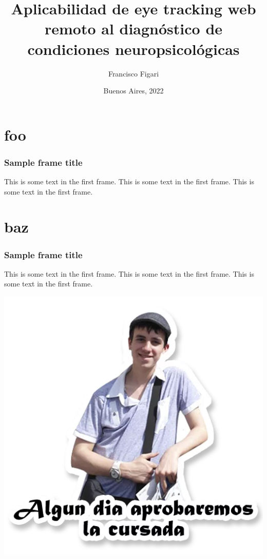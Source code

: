 \documentclass{beamer}
\title{Aplicabilidad de eye tracking web remoto al diagnóstico de
condiciones neuropsicológicas}
\author{Francisco Figari}
\date{Buenos Aires, 2022}
\begin{document}
\frame{\titlepage}

\section{foo}

\begin{frame}

\frametitle{Sample frame title}

This is some text in the first frame.
This is some text in the first frame.
This is some text in the first frame.

\end{frame}

\section{baz}

\begin{frame}

\frametitle{Sample frame title}

This is some text in the first frame.
This is some text in the first frame.
This is some text in the first frame.

\begin{center}
\includegraphics[width=0.5\linewidth]{pipino.png}
\end{center}

\end{frame}
\end{document}
